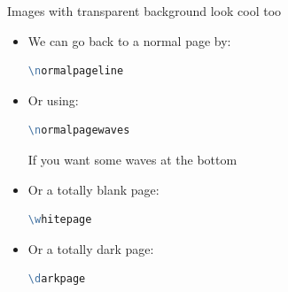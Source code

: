 \documentclass[aspectratio=1610,11pt]{beamer}
\makeatletter
\let\zeropad\@anim@pad
\makeatother
\begin{document}
\darkpageline
\begin{frame}{\insertsection}
    Images with transparent background look cool too
    \begin{animateinline}[poster=last,autoplay,autopause,loop]{15}
    }
    \end{animateinline}
\end{frame}



\normalpageline
\begin{frame}[fragile]{\insertsection}
    \begin{itemize}
        \item We can go back to a normal page by: 
        \begin{lstlisting}[language=tcl,numbers=none]
\normalpageline\end{lstlisting}
    \end{itemize}
\end{frame}



\normalpagewaves
\begin{frame}[fragile]{\insertsection}
    \begin{itemize}
        \item Or using:
        \begin{lstlisting}[language=tcl,numbers=none]
\normalpagewaves\end{lstlisting}
        If you want some waves at the bottom 
    \end{itemize}
\end{frame}



\whitepage
\begin{frame}[fragile]{\insertsection}
    \begin{itemize}
        \item Or a totally blank page:
        \begin{lstlisting}[language=tcl,numbers=none]
\whitepage\end{lstlisting}
    \end{itemize}
\end{frame}

\darkpage
\begin{frame}[fragile]{\insertsection}
    \begin{itemize}
        \item Or a totally dark page:
        \begin{lstlisting}[language=tcl,numbers=none]
\darkpage\end{lstlisting}
    \end{itemize}
\end{frame}
\end{document}
